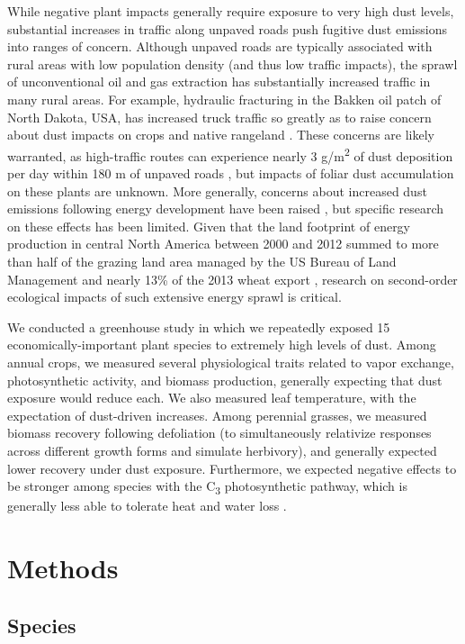 \documentclass{svjour3}
\begin{document}
While negative plant impacts generally require exposure to very high dust levels, substantial increases in traffic along unpaved roads push fugitive dust emissions into ranges of concern. 
Although unpaved roads are typically associated with rural areas with low population density (and thus low traffic impacts), the sprawl of unconventional oil and gas extraction has substantially increased traffic in many rural areas. 
For example, hydraulic fracturing in the Bakken oil patch of North Dakota, USA, has increased truck traffic so greatly as to raise concern about dust impacts on crops and native rangeland \citep{mcgranahan2017}. 
These concerns are likely warranted, as high-traffic routes can experience nearly 3 g/m\textsuperscript{2} of dust deposition per day within 180 m of unpaved roads \citep{spiess2020}, but impacts of foliar dust accumulation on these plants are unknown. 
More generally, concerns about increased dust emissions following energy development have been raised \citep[e.g.,][]{field2010}, but specific research on these effects has been limited. 
Given that the land footprint of energy production in central North America between 2000 and 2012 summed to more than half of the grazing land area managed by the US Bureau of Land Management and nearly 13\% of the 2013 wheat export \citep{allred2015}, research on second-order ecological impacts of such extensive energy sprawl is critical. 

We conducted a greenhouse study in which we repeatedly exposed 15 economically-important plant species to extremely high levels of dust. 
Among annual crops, we measured several physiological traits related to vapor exchange, photosynthetic activity, and biomass production, generally expecting that dust exposure would reduce each. 
We also measured leaf temperature, with the expectation of dust-driven increases.
Among perennial grasses, we measured biomass recovery following defoliation (to simultaneously relativize responses across different growth forms and simulate herbivory), and generally expected lower recovery under dust exposure. 
Furthermore, we expected negative effects to be stronger among species with the C\textsubscript{3} photosynthetic pathway, which is generally less able to tolerate heat and water loss \citep[e.g.,][]{killi2017}. 

\section{Methods}

\subsection{Species}
\end{document}
